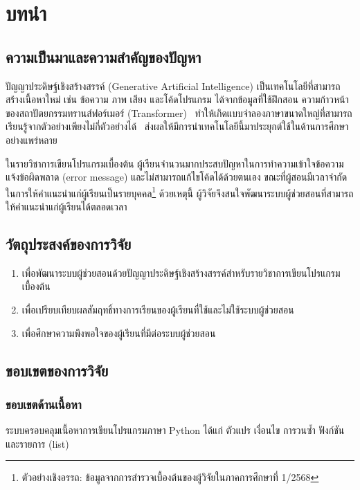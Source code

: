 \chapter{บทนำ}
\label{ch:intro}

\section{ความเป็นมาและความสำคัญของปัญหา}

ปัญญาประดิษฐ์เชิงสร้างสรรค์ (Generative Artificial Intelligence) เป็นเทคโนโลยีที่สามารถสร้างเนื้อหาใหม่ เช่น ข้อความ ภาพ เสียง และโค้ดโปรแกรม ได้จากข้อมูลที่ใช้ฝึกสอน ความก้าวหน้าของสถาปัตยกรรมทรานส์ฟอร์เมอร์ (Transformer)~\cite{vaswani2017attention} ทำให้เกิดแบบจำลองภาษาขนาดใหญ่ที่สามารถเรียนรู้จากตัวอย่างเพียงไม่กี่ตัวอย่างได้~\cite{brown2020language} ส่งผลให้มีการนำเทคโนโลยีนี้มาประยุกต์ใช้ในด้านการศึกษาอย่างแพร่หลาย

ในรายวิชาการเขียนโปรแกรมเบื้องต้น ผู้เรียนจำนวนมากประสบปัญหาในการทำความเข้าใจข้อความแจ้งข้อผิดพลาด (error message) และไม่สามารถแก้ไขโค้ดได้ด้วยตนเอง ขณะที่ผู้สอนมีเวลาจำกัดในการให้คำแนะนำแก่ผู้เรียนเป็นรายบุคคล\footnote{ตัวอย่างเชิงอรรถ: ข้อมูลจากการสำรวจเบื้องต้นของผู้วิจัยในภาคการศึกษาที่ 1/2568} ด้วยเหตุนี้ ผู้วิจัยจึงสนใจพัฒนาระบบผู้ช่วยสอนที่สามารถให้คำแนะนำแก่ผู้เรียนได้ตลอดเวลา

\section{วัตถุประสงค์ของการวิจัย}

\begin{enumerate}
  \item เพื่อพัฒนาระบบผู้ช่วยสอนด้วยปัญญาประดิษฐ์เชิงสร้างสรรค์สำหรับรายวิชาการเขียนโปรแกรมเบื้องต้น
  \item เพื่อเปรียบเทียบผลสัมฤทธิ์ทางการเรียนของผู้เรียนที่ใช้และไม่ใช้ระบบผู้ช่วยสอน
  \item เพื่อศึกษาความพึงพอใจของผู้เรียนที่มีต่อระบบผู้ช่วยสอน
\end{enumerate}

\section{ขอบเขตของการวิจัย}

\subsection{ขอบเขตด้านเนื้อหา}
ระบบครอบคลุมเนื้อหาการเขียนโปรแกรมภาษา Python ได้แก่ ตัวแปร เงื่อนไข การวนซ้ำ ฟังก์ชัน และรายการ (list)

